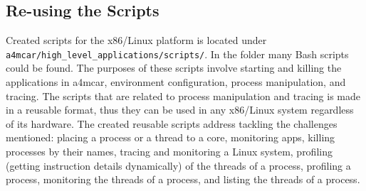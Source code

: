 \subsection{Re-using the Scripts}
Created scripts for the x86/Linux platform is located under \texttt{a4mcar/high{\_}level{\_}applications/scripts/}. In the folder many Bash scripts could be found. The purposes of these scripts involve starting and killing the applications in a4mcar, environment configuration, process manipulation, and tracing. The scripts that are related to process manipulation and tracing is made in a reusable format, thus they can be used in any x86/Linux system regardless of its hardware. The created reusable scripts address tackling the challenges mentioned: placing a process or a thread to a core, monitoring apps, killing processes by their names, tracing and monitoring a Linux system, profiling (getting instruction details dynamically) of the threads of a process, profiling a process, monitoring the threads of a process, and listing the threads of a process.

\newpage
{}


